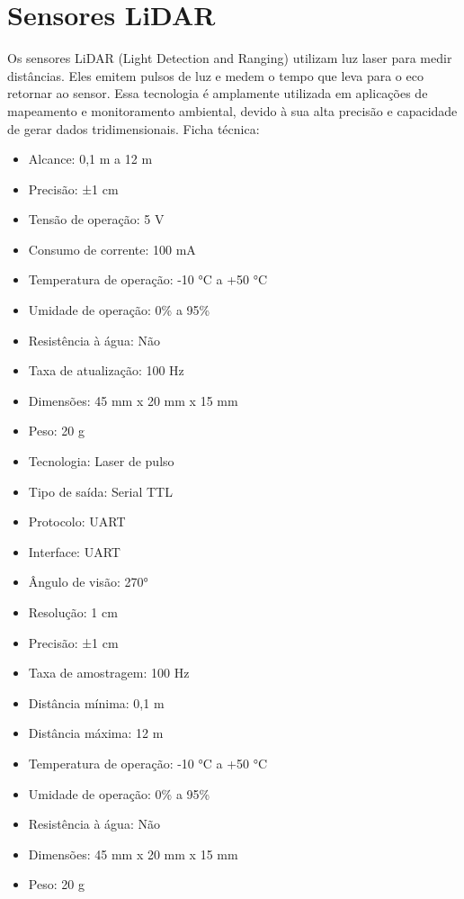 \section{Sensores LiDAR}
Os sensores LiDAR (Light Detection and Ranging) utilizam luz laser para medir distâncias. Eles emitem pulsos de luz e medem o tempo que leva para o eco retornar ao sensor. Essa tecnologia é amplamente utilizada em aplicações de mapeamento e monitoramento ambiental, devido à sua alta precisão e capacidade de gerar dados tridimensionais.
Ficha técnica:
\begin{itemize}
	\item Alcance: 0,1 m a 12 m
	\item Precisão: ±1 cm
	\item Tensão de operação: 5 V
	\item Consumo de corrente: 100 mA
	\item Temperatura de operação: -10 °C a +50 °C
	\item Umidade de operação: 0\% a 95\%
	\item Resistência à água: Não
	\item Taxa de atualização: 100 Hz
	\item Dimensões: 45 mm x 20 mm x 15 mm
	\item Peso: 20 g
	\item Tecnologia: Laser de pulso
	\item Tipo de saída: Serial TTL
	\item Protocolo: UART
	\item Interface: UART
	\item Ângulo de visão: 270°
	\item Resolução: 1 cm
	\item Precisão: ±1 cm
	\item Taxa de amostragem: 100 Hz
	\item Distância mínima: 0,1 m
	\item Distância máxima: 12 m
	\item Temperatura de operação: -10 °C a +50 °C
	\item Umidade de operação: 0\% a 95\%
	\item Resistência à água: Não	
	\item Dimensões: 45 mm x 20 mm x 15 mm
	\item Peso: 20 g
\end{itemize}
